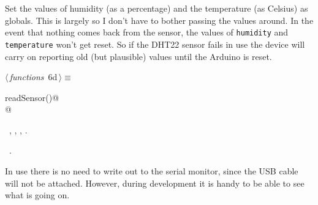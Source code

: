 \documentclass[a4paper, 11pt]{article}
\begin{document}
Set the values of humidity (as a percentage)
and the temperature (as Celsius) as globals.
This is largely so I don't have to bother passing the values around.
In the event that nothing comes back from the sensor,
the values of \verb|humidity| and \verb|temperature|
won't get reset.
So if the DHT22 sensor fails in use
the device will carry on reporting old
(but plausible) values
until the Arduino is reset.

\begin{flushleft} \small
\begin{minipage}{\linewidth}\label{scrap5}\raggedright\small
{}$\langle\,${\itshape functions}\nobreak\ {\footnotesize{6d}}$\,\rangle\equiv$
\vspace{-1ex}
\begin{list}{}{\setlength{\leftmargin}{1em}} \item
\mbox{}\lstinline@void readSensor()@\\
\mbox{}@\\
\mbox{}{\NWsep}
\end{list}
\vspace{-1ex}
\vspace{-1ex}
\footnotesize
\begin{list}{}{\setlength{\itemsep}{-\parsep}\setlength{\itemindent}{-\leftmargin}}
\item \NWtxtMacroDefBy\ , , , .
\item \NWtxtMacroRefIn\ .
\end{list}
\end{minipage}
\end{flushleft}

In use there is no need to write out to the serial monitor,
since the USB cable will not be attached.
However, during development it is handy to be able to see what is going on.
\end{document}
